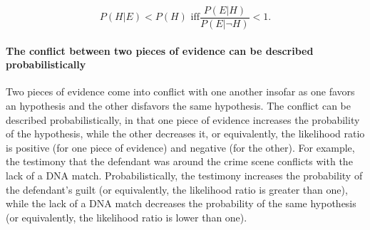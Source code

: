 \documentclass[10pt]{article}
\begin{document}
%
%
%
\[ P(H|E) < P(H) \text{ iff}  \frac{P(E|H)}{P(E|\neg H)} < 1.\]
%
%
%

\paragraph{The conflict between two pieces of evidence can be described probabilistically}
Two pieces of evidence come into 
conflict with one another insofar as one favors an hypothesis 
and the other disfavors the same hypothesis. 
The conflict can be described probabilistically, in that one piece of evidence increases 
the probability of the hypothesis, while the other decreases it, or equivalently, the likelihood ratio is positive (for one piece 
of evidence) and negative (for the other). 
%
%
%
%
For example, the testimony that the defendant was around the crime scene conflicts 
with the lack of a DNA match. Probabilistically, the testimony 
increases the probability of the defendant's guilt (or equivalently, the likelihood ratio is greater than one),
while the lack of a DNA match decreases the probability of the same hypothesis 
(or equivalently, the likelihood ratio is lower than one).
\end{document}
